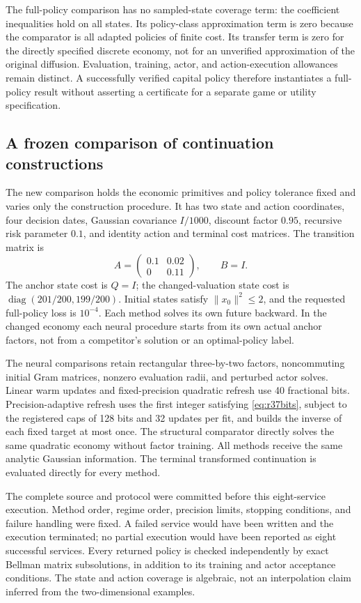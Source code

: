 The full-policy comparison has no sampled-state coverage term: the coefficient
inequalities hold on all states. Its policy-class approximation term is zero
because the comparator is all adapted policies of finite cost. Its transfer
term is zero for the directly specified discrete economy, not for an
unverified approximation of the original diffusion. Evaluation, training,
actor, and action-execution allowances remain distinct. A successfully
verified capital policy therefore instantiates a full-policy result without
asserting a certificate for a separate game or utility specification.

\subsection{A frozen comparison of continuation constructions}
The new comparison holds the economic primitives and policy tolerance fixed
and varies only the construction procedure. It has two state and action
coordinates, four decision dates, Gaussian covariance $I/1000$, discount
factor $0.95$, recursive risk parameter $0.1$, and identity action and terminal
cost matrices. The transition matrix is
\[
 A=\begin{pmatrix}0.1&0.02\\0&0.11\end{pmatrix},\qquad B=I.
\]
The anchor state cost is $Q=I$; the changed-valuation state cost is
$\operatorname{diag}(201/200,199/200)$. Initial states satisfy
$\|x_0\|^2\leq2$, and the requested full-policy loss is $10^{-4}$.
Each method solves its own future backward. In the changed economy each
neural procedure starts from its own actual anchor factors, not from a
competitor's solution or an optimal-policy label.

The neural comparisons retain rectangular three-by-two factors,
noncommuting initial Gram matrices, nonzero evaluation radii, and perturbed
actor solves. Linear warm updates and fixed-precision quadratic refresh use
40 fractional bits. Precision-adaptive refresh uses the first integer
satisfying \eqref{eq:r37bits}, subject to the registered caps of 128 bits and
32 updates per fit, and builds the inverse of each fixed target at most once.
The structural comparator directly solves the same quadratic economy without
factor training. All methods receive the same analytic Gaussian information.
The terminal transformed continuation is evaluated directly for every method.

The complete source and protocol were committed before this eight-service
execution. Method order, regime order, precision limits, stopping conditions,
and failure handling were fixed. A failed service would have been written
and the execution terminated; no partial execution would have been reported
as eight successful services. Every returned policy is checked independently
by exact Bellman matrix subsolutions, in addition to its training and actor
acceptance conditions. The state and action coverage is algebraic, not an
interpolation claim inferred from the two-dimensional examples.

